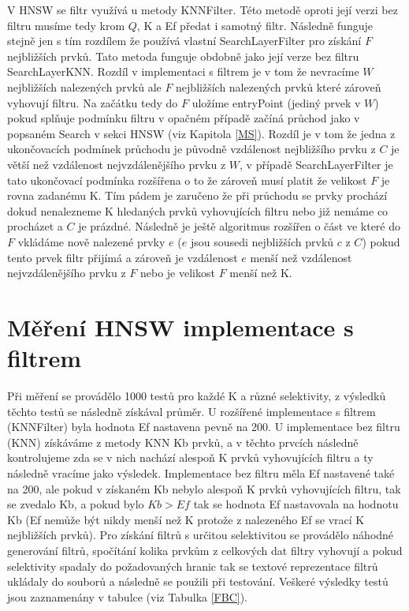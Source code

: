 \documentclass[czech,semestral,dept460,male,csharp,cpdeclaration]{diploma}
\begin{document}
		V HNSW se filtr využívá u metody KNNFilter. Této metodě oproti její verzi bez filtru musíme tedy krom $Q$, K a Ef předat i samotný filtr. Následně funguje stejně jen s tím rozdílem že používá vlastní SearchLayerFilter pro získání $F$ nejbližších prvků. Tato metoda funguje obdobně jako její verze bez filtru SearchLayerKNN. Rozdíl v implementaci s filtrem je v tom že nevracíme $W$ nejbližších nalezených prvků ale $F$ nejbližších nalezených prvků které zároveň vyhovují filtru. Na začátku tedy do $F$ uložíme entryPoint (jediný prvek v $W$) pokud splňuje podmínku filtru v opačném případě začíná průchod jako v popsaném Search v sekci HNSW (viz Kapitola \ref{MS}). Rozdíl je v tom že jedna z ukončovacích podmínek průchodu je původně vzdálenost nejbližšího prvku z $C$ je větší než vzdálenost nejvzdálenějšího prvku z $W$, v případě SearchLayerFilter je tato ukončovací podmínka rozšířena o to že zároveň musí platit že velikost $F$ je rovna zadanému K. Tím pádem je zaručeno že při průchodu se prvky prochází dokud nenalezneme K hledaných prvků vyhovujících filtru nebo již nemáme co procházet a $C$ je prázdné. Následně je ještě algoritmus rozšířen o část ve které do $F$ vkládáme nově nalezené prvky $e$ ($e$ jsou sousedi nejbližších prvků $c$ z $C$) pokud tento prvek filtr přijímá a zároveň je vzdálenost $e$ menší než vzdálenost nejvzdálenějšího prvku z $F$ nebo je velikost $F$ menší než K.
		
		\section{Měření HNSW implementace s filtrem}
		
		Při měření se provádělo 1000 testů pro každé K a různé selektivity, z výsledků těchto testů se následně získával průměr. U rozšířené implementace s filtrem (KNNFilter) byla hodnota Ef nastavena pevně na 200. U implementace bez filtru (KNN) získáváme z metody KNN Kb prvků, a v těchto prvcích následně kontrolujeme zda se v nich nachází alespoň K prvků vyhovujících filtru a ty následně vracíme jako výsledek. Implementace bez filtru měla Ef nastavené také na 200, ale pokud v získaném Kb nebylo alespoň K prvků vyhovujících filtru, tak se zvedalo Kb, a pokud bylo $Kb > Ef$ tak se hodnota Ef nastavovala na hodnotu Kb (Ef nemůže být nikdy menší než K protože z nalezeného Ef se vrací K nejbližších prvků). Pro získání filtrů s určitou selektivitou se provádělo náhodné generování filtrů, spočítání kolika prvkům z celkových dat filtry vyhovují a pokud selektivity spadaly do požadovaných hranic tak se textové reprezentace filtrů ukládaly do souborů a následně se použili při testování. Veškeré výsledky testů jsou zaznamenány v tabulce (viz Tabulka \ref{FBC}).
		
\end{document}
